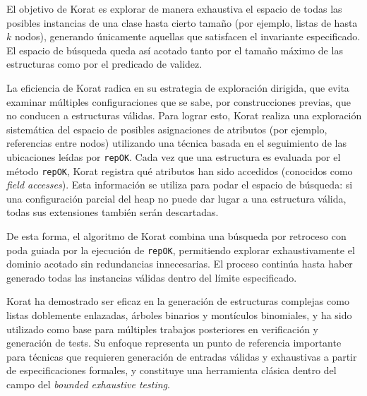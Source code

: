 El objetivo de Korat es explorar de manera exhaustiva el espacio de todas las posibles instancias de una clase hasta cierto tamaño (por ejemplo, listas de hasta $k$ nodos), 
generando únicamente aquellas que satisfacen el invariante especificado. 
El espacio de búsqueda queda así acotado tanto por el tamaño máximo de las estructuras como por el predicado de validez.

La eficiencia de Korat radica en su estrategia de exploración dirigida, 
que evita examinar múltiples configuraciones que se sabe, por construcciones previas, que no conducen a estructuras válidas. 
Para lograr esto, Korat realiza una exploración sistemática del espacio de
posibles asignaciones de atributos (por ejemplo, referencias entre nodos) utilizando una técnica basada en el seguimiento de las ubicaciones leídas por \texttt{repOK}.
Cada vez que una estructura es evaluada por el método \texttt{repOK}, Korat
registra qué atributos han sido accedidos (conocidos como \emph{field
accesses}). Esta información se utiliza para podar el espacio de búsqueda: si
una configuración parcial del heap no puede dar lugar a una estructura válida, 
todas sus extensiones también serán descartadas.

De esta forma, el algoritmo de Korat combina una búsqueda por retroceso con poda guiada por la ejecución de \texttt{repOK}, permitiendo explorar exhaustivamente el dominio acotado sin redundancias innecesarias. El proceso continúa hasta haber generado todas las instancias válidas dentro del límite especificado.

Korat ha demostrado ser eficaz en la generación de estructuras complejas como listas doblemente enlazadas, árboles binarios y montículos binomiales, y ha sido utilizado como base para múltiples trabajos posteriores en verificación y generación de tests. Su enfoque representa un punto de referencia importante para técnicas que requieren generación de entradas válidas y exhaustivas a partir de especificaciones formales, y constituye una herramienta clásica dentro del campo del \emph{bounded exhaustive testing}.









